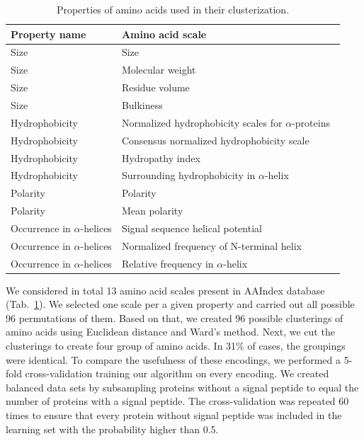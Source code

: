 \documentclass[10pt,letterpaper]{article}
\begin{document}
\begin{table}[ht]
\centering
\caption{Properties of amino acids used in their clusterization.} 
\begin{tabular}{ll}
  \toprule
Property name & Amino acid scale \\ 
  \midrule
Size & Size~\cite{dawson1972size} \\ 
   \rowcolor[gray]{0.85}Size & Molecular weight~\cite{fasman1976handbook}\\ 
  Size & Residue volume~\cite{1973goldsackcontribution} \\ 
   \rowcolor[gray]{0.85}Size & Bulkiness~\cite{1968zimmermanthe} \\ 
  Hydrophobicity & Normalized hydrophobicity scales for $\alpha$-proteins~\cite{1992cidhydrophobicity} \\ 
   \rowcolor[gray]{0.85}Hydrophobicity & Consensus normalized hydrophobicity scale~\cite{1984eisenbergthreedimensional} \\ 
  Hydrophobicity & Hydropathy index~\cite{1982kytea} \\ 
   \rowcolor[gray]{0.85}Hydrophobicity & Surrounding hydrophobicity in $\alpha$-helix~\cite{1980ponnuswamyhydrophobic} \\ 
  Polarity & Polarity~\cite{1974granthamamino} \\ 
   \rowcolor[gray]{0.85}Polarity & Mean polarity~\cite{1988radzickainfluences} \\ 
  Occurrence in $\alpha$-helices & Signal sequence helical potential~\cite{1982argosstructural} \\ 
   \rowcolor[gray]{0.85}Occurrence in $\alpha$-helices & Normalized frequency of N-terminal helix~\cite{chou1978prediction} \\ 
  Occurrence in $\alpha$-helices & Relative frequency in $\alpha$-helix~\cite{1990prabhakaranthe} \\ 
   \bottomrule
\end{tabular}
\label{tab:aaprop}
\end{table}

We considered in total 13 amino acid scales present in AAIndex database~\cite{2008kawashimaaaindex} (Tab.~\ref{tab:aaprop}). We selected one scale per a given property and carried out all possible 96 permutations of them. Based on that, we created 96 possible clusterings of amino acids using Euclidean distance and Ward's method. Next, we cut the clusterings to create four group of amino acids. In 31\% of cases, the groupings were identical. To compare the usefulness of these encodings, we performed a 5-fold cross-validation training our algorithm on every encoding. We created balanced data sets by subsampling proteins without a signal peptide to equal the number of proteins with a signal peptide. The cross-validation was repeated 60 times to ensure that every protein without signal peptide was included in the learning set with the probability higher than 0.5.
\end{document}
